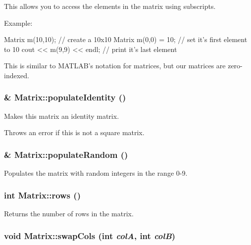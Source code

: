 This allows you to access the elements in the matrix using subscripts. 

Example: 
\begin{DoxyCode}
                Matrix m(10,10);        // create a 10x10 Matrix
                m(0,0) = 10;            // set it's first element to 10
                cout << m(9,9) << endl; // print it's last element
\end{DoxyCode}
 This is similar to MATLAB's notation for matrices, but our matrices are zero-\/indexed. \hypertarget{class_matrix_a0ee71091770a4e83e54860f291ef1b7d}{
\subsubsection[{populateIdentity}]{ \& Matrix::populateIdentity ()}}
\label{class_matrix_a0ee71091770a4e83e54860f291ef1b7d}


Makes this matrix an identity matrix. 

Throws an error if this is not a square matrix. \hypertarget{class_matrix_a375fc575a7e042d0eed3d76c7470e59f}{
\subsubsection[{populateRandom}]{ \& Matrix::populateRandom ()}}
\label{class_matrix_a375fc575a7e042d0eed3d76c7470e59f}


Populates the matrix with random integers in the range 0-\/9. 

\hypertarget{class_matrix_add9c23e5ff5e2456a8d48024ab19fe96}{
\subsubsection[{rows}]{\setlength{\rightskip}{0pt plus 5cm}int Matrix::rows ()}}
\label{class_matrix_add9c23e5ff5e2456a8d48024ab19fe96}


Returns the number of rows in the matrix. 

\hypertarget{class_matrix_a505f924baa7c236280751499da56ecee}{
\subsubsection[{swapCols}]{\setlength{\rightskip}{0pt plus 5cm}void Matrix::swapCols (int {\em colA}, \/  int {\em colB})}}
\label{class_matrix_a505f924baa7c236280751499da56ecee}


